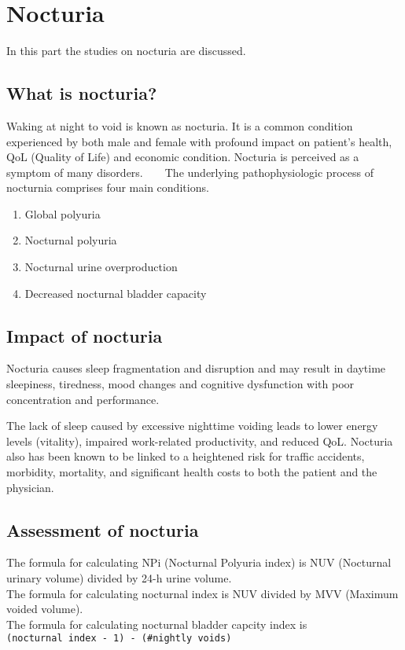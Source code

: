 \section{Nocturia}

In this part the studies on nocturia are discussed. 

\subsection{What is nocturia?}

Waking at night to void is known as nocturia. It is a common condition experienced by both male and female with profound impact on patient's health, \gls{QoL} (Quality of Life) and economic condition. Nocturia is perceived as a symptom of many disorders. ~\textcite{nocturia_symptom} ~\textcite{nocturia_misjudged}
The underlying pathophysiologic process of nocturnia comprises four main conditions. 

\begin{enumerate}
	\item{Global polyuria}
	\item{Nocturnal polyuria}
	\item{Nocturnal urine overproduction}
	\item{Decreased nocturnal bladder capacity}
\end{enumerate}

\subsection{Impact of nocturia}

Nocturia causes sleep fragmentation and disruption and may result in daytime sleepiness, tiredness, mood changes and cognitive dysfunction with poor concentration and performance. ~\textcite{nocturia_mgmt} 


The lack of sleep caused by excessive nighttime voiding leads to lower energy levels (vitality), impaired work-related productivity, and reduced \gls{QoL}. Nocturia also has been known to be linked to a heightened risk for traffic accidents, morbidity, mortality, and significant health costs to both the patient and the physician.  ~\textcite{Nocturia_productivity}

\subsection{Assessment of nocturia}

The formula for calculating \gls{NPi} (Nocturnal Polyuria index) is \gls{NUV} (Nocturnal urinary volume) divided by 24-h urine volume. \\
The formula for calculating nocturnal index is \gls{NUV} divided by \gls{MVV} (Maximum voided volume). \\
The formula for calculating nocturnal bladder capcity index is \\ \verb|(nocturnal index - 1) - (#nightly voids)|

